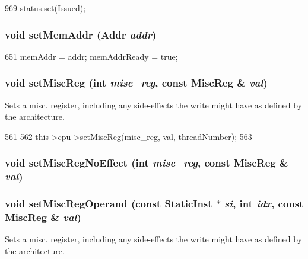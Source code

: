 \begin{DoxyCode}
969 { status.set(Issued); }
\end{DoxyCode}
\hypertarget{classInOrderDynInst_a26ecfda1674171a0405414561a59d4d1}{
\subsubsection[{setMemAddr}]{\setlength{\rightskip}{0pt plus 5cm}void setMemAddr ({\bf Addr} {\em addr})}}
\label{classInOrderDynInst_a26ecfda1674171a0405414561a59d4d1}



\begin{DoxyCode}
651     { memAddr = addr; memAddrReady = true;}
\end{DoxyCode}
\hypertarget{classInOrderDynInst_a1877dde4f3eb17a8b7d33ea40176c148}{
\subsubsection[{setMiscReg}]{\setlength{\rightskip}{0pt plus 5cm}void setMiscReg (int {\em misc\_\-reg}, \/  const {\bf MiscReg} \& {\em val})}}
\label{classInOrderDynInst_a1877dde4f3eb17a8b7d33ea40176c148}
Sets a misc. register, including any side-\/effects the write might have as defined by the architecture. 


\begin{DoxyCode}
561 {
562     this->cpu->setMiscReg(misc_reg, val, threadNumber);
563 }
\end{DoxyCode}
\hypertarget{classInOrderDynInst_a763517aaea2f3decbc1ef9d064216b6f}{
\subsubsection[{setMiscRegNoEffect}]{\setlength{\rightskip}{0pt plus 5cm}void setMiscRegNoEffect (int {\em misc\_\-reg}, \/  const {\bf MiscReg} \& {\em val})}}
\label{classInOrderDynInst_a763517aaea2f3decbc1ef9d064216b6f}
\hypertarget{classInOrderDynInst_a6cfad8f780bab7feb893941cb0d46160}{
\subsubsection[{setMiscRegOperand}]{\setlength{\rightskip}{0pt plus 5cm}void setMiscRegOperand (const {\bf StaticInst} $\ast$ {\em si}, \/  int {\em idx}, \/  const {\bf MiscReg} \& {\em val})}}
\label{classInOrderDynInst_a6cfad8f780bab7feb893941cb0d46160}
Sets a misc. register, including any side-\/effects the write might have as defined by the architecture. 


